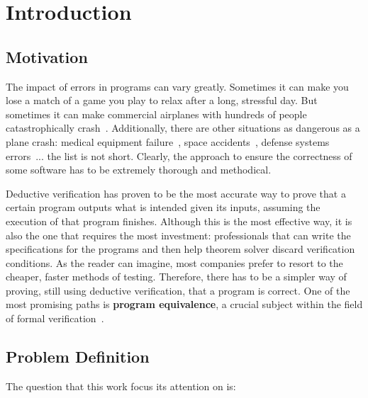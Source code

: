 
%

\chapter{Introduction}
\label{cha:introduction}

\section{Motivation} 

The impact of errors in programs can vary greatly.
Sometimes it can make you lose a match of a game you play to relax after a long, stressful day.
But sometimes it can make commercial airplanes with hundreds of people catastrophically crash~\cite{air-india}.
Additionally, there are other situations as dangerous as a plane crash: medical equipment failure~\cite{therac-25}, space accidents~\cite{ariane}, defense systems errors~\cite{patriot}... the list is not short.
Clearly, the approach to ensure the correctness of some software has to be extremely thorough and methodical.

Deductive verification has proven to be the most accurate way to prove that a certain program outputs what is intended given its inputs, assuming the execution of that program finishes.
Although this is the most effective way, it is also the one that requires the most investment: professionals that can write the specifications for the programs and then help theorem solver discard verification conditions.
As the reader can imagine, most companies prefer to resort to the cheaper, faster methods of testing.
Therefore, there has to be a simpler way of proving, still using deductive verification, that a program is correct.
One of the most promising paths is \textbf{program equivalence}, a crucial subject within the field of formal verification~\cite{DBLP:journals/fmsd/Strichman18}.


\section{Problem Definition}

The question that this work focus its attention on is:

